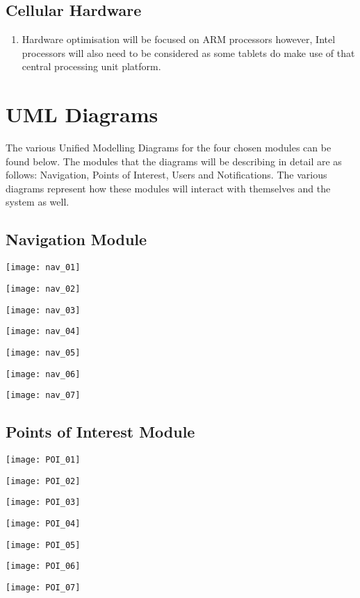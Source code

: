\documentclass[11pt]{article}
\begin{document}
\subsection{Cellular Hardware}

\begin{enumerate}

\item Hardware optimisation will be focused on ARM processors however, Intel processors will also need to be considered as some tablets do make use of that central processing unit platform.

\end{enumerate}

\newpage

\section{UML Diagrams}
The various Unified Modelling Diagrams for the four chosen modules can be found below. The modules that the diagrams will be describing in detail are as follows: Navigation, Points of Interest, Users and Notifications. The various diagrams represent how these modules will interact with themselves and the system as well. 

\subsection{Navigation Module}

\centerline{\texttt{[image: nav\_01]}}
\newpage
\centerline{\texttt{[image: nav\_02]}}
\newpage
\centerline{\texttt{[image: nav\_03]}}
\newpage
\centerline{\texttt{[image: nav\_04]}}
\newpage
\centerline{\texttt{[image: nav\_05]}}
\newpage
\centerline{\texttt{[image: nav\_06]}}
\newpage
\texttt{[image: nav\_07]}
\newpage

\subsection{Points of Interest Module}

\centerline{\texttt{[image: POI\_01]}}
\newpage
\centerline{\texttt{[image: POI\_02]}}
\newpage
\centerline{\texttt{[image: POI\_03]}}
\newpage
\centerline{\texttt{[image: POI\_04]}}
\newpage
\centerline{\texttt{[image: POI\_05]}}
\newpage
\centerline{\texttt{[image: POI\_06]}}
\newpage
\centerline{\texttt{[image: POI\_07]}}
\newpage
\end{document}
